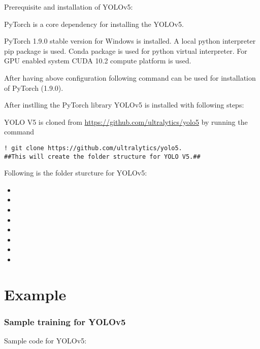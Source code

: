 Prerequisite and installation of YOLOv5:

PyTorch is a core dependency for installing the YOLOv5. 

PyTorch 1.9.0 stable version for Windows is installed. A local python interpreter pip package is used. Conda package is used for python virtual interpreter. For GPU enabled system CUDA 10.2 compute platform is used.

After having above configuration following command can be used for installation of PyTorch (1.9.0).

\medskip


\medskip

After instlling the PyTorch library YOLOv5 is installed with following steps:

YOLO V5 is cloned from \url{https://github.com/ultralytics/yolo5} by running the command

\begin{lstlisting}
! git clone https://github.com/ultralytics/yolo5. 
##This will create the folder structure for YOLO V5.##
\end{lstlisting}

Following is the folder sturcture for YOLOv5:


\begin{itemize}
  \item {}
  \item {}
  \item {}
  \item {}
  \item {}
  \item {}
  \item {}
  \item {}
\end{itemize}

\section{Example}

\subsubsection{Sample training for YOLOv5}

Sample code for YOLOv5:

